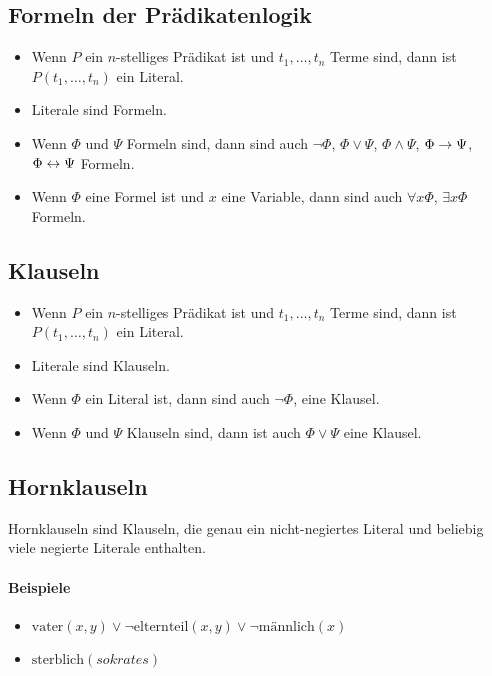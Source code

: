 \documentclass[a4paper,twoside,DIV15,BCOR12mm]{scrbook}
\begin{document}
\subsection{Formeln der Prädikatenlogik}
\begin{itemize}
\item Wenn $P$ ein $n$-stelliges Prädikat ist und $t_1, \ldots, t_n$ Terme sind, dann ist $P(t_1, \ldots, t_n)$ ein Literal.
\item Literale sind Formeln.
\item Wenn $\Phi$ und $\Psi$ Formeln sind, dann sind auch $\neg\Phi$, $\Phi\vee\Psi$, $\Phi\wedge\Psi$, $\Phi\rightarrow\Psi$, $\Phi\leftrightarrow\Psi$ Formeln.
\item Wenn $\Phi$ eine Formel ist und $x$ eine Variable, dann sind auch $\forall x\Phi$, $\exists x\Phi$ Formeln.
\end{itemize}

\subsection{Klauseln}
\begin{itemize}
\item Wenn $P$ ein $n$-stelliges Prädikat ist und $t_1, \ldots, t_n$ Terme sind, dann ist $P(t_1, \ldots, t_n)$ ein Literal.
\item Literale sind Klauseln.
\item Wenn $\Phi$ ein Literal ist, dann sind auch $\neg\Phi$, eine Klausel.
\item Wenn $\Phi$ und $\Psi$ Klauseln sind, dann ist auch $\Phi \vee \Psi$ eine Klausel.
\end{itemize}

\subsection{Hornklauseln}

Hornklauseln sind Klauseln, die genau ein nicht-negiertes Literal und beliebig viele negierte Literale enthalten.

\paragraph{Beispiele}
\begin{itemize}
\item $\text{vater}(x,y) \vee \neg\text{elternteil}(x,y) \vee \neg\text{männlich}(x)$ 
\item $\text{sterblich}(sokrates)$
\end{itemize}
\end{document}
